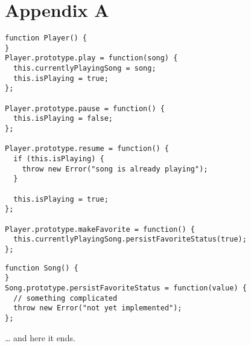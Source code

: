 \documentclass[a4paper,11pt]{article}
\begin{document}
\section{Appendix A}
\begin{lstlisting}[label=some-code,caption=Player.js,style = customjava]
function Player() {
}
Player.prototype.play = function(song) {
  this.currentlyPlayingSong = song;
  this.isPlaying = true;
};

Player.prototype.pause = function() {
  this.isPlaying = false;
};

Player.prototype.resume = function() {
  if (this.isPlaying) {
    throw new Error("song is already playing");
  }

  this.isPlaying = true;
};

Player.prototype.makeFavorite = function() {
  this.currentlyPlayingSong.persistFavoriteStatus(true);
};
\end{lstlisting}
\begin{lstlisting}[label=some-code,caption=Song.js, keywordstyle=\color{blue}, style = customjava]
function Song() {
}
Song.prototype.persistFavoriteStatus = function(value) {
  // something complicated
  throw new Error("not yet implemented");
};
\end{lstlisting}
\ldots{} and here it ends.
\end{document}
